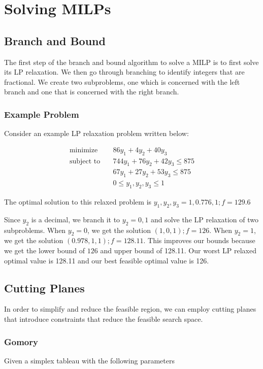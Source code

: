 \section{Solving MILPs}
\subsection{Branch and Bound}
The first step of the branch and bound algorithm to solve a MILP is to first solve its LP relaxation.
We then go through branching to identify integers that are fractional.
We create two subproblems, one which is concerned with the left branch and one that is concerned with the right branch.

\subsubsection{Example Problem}
Consider an example LP relaxation problem written below:

\begin{align}
  \text{minimize} & \quad  86y_1 + 4y_2 + 40y_3\\
  \text{subject to} & \quad 744 y_1 + 76y_2 + 42y_3 \leq 875 \\
  & \quad 67y_1 + 27y_2 + 53y_3 \leq 875 \\
  & \quad 0 \leq y_1, y_2, y_3 \leq 1
\end{align}

The optimal solution to this relaxed problem is 
$y_1, y_2,y_3 = 1, 0.776, 1; f = 129.6$

Since $y_2$ is a decimal, we branch it to $y_2 = 0,1$ and solve the LP relaxation of two subproblems.
When $y_2 = 0$, we get the solution $(1,0,1); f = 126$. 
When $y_2=1$, we get the solution $(0.978,1,1); f = 128.11$.
This improves our bounds because we get the lower bound of $126$ and upper bound of 128.11.
Our worst LP relaxed optimal value is 128.11 and our best feasible optimal value is 126.

\subsection{Cutting Planes}
In order to simplify and reduce the feasible region, we can employ cutting planes that introduce constraints that reduce the feasible search space.
\subsubsection{Gomory}
Given a simplex tableau with the following parameters

